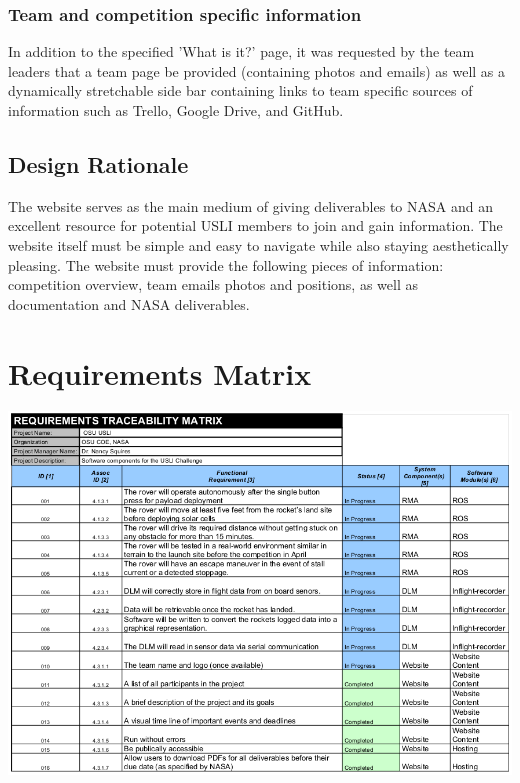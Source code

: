 \documentclass[onecolumn, draftclsnofoot,10pt, compsoc]{IEEEtran}
\begin{document}
\subsubsection{Team and competition specific information}
In addition to the specified 'What is it?' page, it was requested by the team leaders that a team page be provided (containing photos and emails) as well as a dynamically stretchable side bar containing links to team specific sources of information such as Trello, Google Drive, and GitHub.
\subsection{Design Rationale}
The website serves as the main medium of giving deliverables to NASA and an excellent resource for potential USLI members to join and gain information. The website itself must be simple and easy to navigate while also staying aesthetically pleasing. The website must provide the following pieces of information: competition overview, team emails photos and positions, as well as documentation and NASA deliverables.
\section{Requirements Matrix}
\includegraphics[width=\textwidth]{reqMatrix}
\nocite{*}%

%
\end{document}
